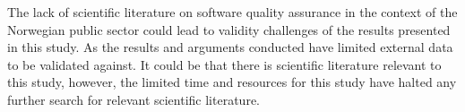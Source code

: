 The lack of scientific literature on software quality assurance in the context of the Norwegian public sector could lead to validity challenges of the results presented in this study. As the results and arguments conducted have limited external data to be validated against. It could be that there is scientific literature relevant to this study, however, the limited time and resources for this study have halted any further search for relevant scientific literature.



